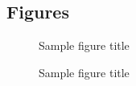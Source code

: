 \documentclass{bmcart}
\begin{document}
\begin{backmatter}





\section*{Figures}
  \begin{figure}[h!]
  \caption{Sample figure title}
\end{figure}

\begin{figure}[h!]
  \caption{Sample figure title}
\end{figure}


\end{backmatter}
\end{document}
